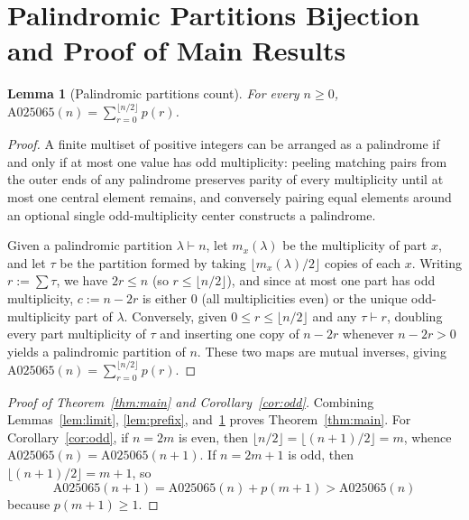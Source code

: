 \documentclass[11pt]{article}
\newtheorem{lemma}[theorem]{Lemma}
\begin{document}
\section{Palindromic Partitions Bijection and Proof of Main Results}

\begin{lemma}[Palindromic partitions count]\label{lem:pal}
For every $n \ge 0$, $\mathrm{A025065}(n) = \sum_{r=0}^{\lfloor n/2 \rfloor} p(r)$.
\end{lemma}

\begin{proof}
A finite multiset of positive integers can be arranged as a palindrome if and only if at most one value has odd multiplicity: peeling matching pairs from the outer ends of any palindrome preserves parity of every multiplicity until at most one central element remains, and conversely pairing equal elements around an optional single odd-multiplicity center constructs a palindrome.

Given a palindromic partition $\lambda \vdash n$, let $m_x(\lambda)$ be the multiplicity of part $x$, and let $\tau$ be the partition formed by taking $\lfloor m_x(\lambda)/2 \rfloor$ copies of each $x$. Writing $r := \sum \tau$, we have $2r \le n$ (so $r \le \lfloor n/2 \rfloor$), and since at most one part has odd multiplicity, $c := n - 2r$ is either $0$ (all multiplicities even) or the unique odd-multiplicity part of $\lambda$. Conversely, given $0 \le r \le \lfloor n/2 \rfloor$ and any $\tau \vdash r$, doubling every part multiplicity of $\tau$ and inserting one copy of $n - 2r$ whenever $n - 2r > 0$ yields a palindromic partition of $n$. These two maps are mutual inverses, giving $\mathrm{A025065}(n) = \sum_{r=0}^{\lfloor n/2 \rfloor} p(r)$.
\end{proof}

\begin{proof}[Proof of Theorem~\ref{thm:main} and Corollary~\ref{cor:odd}]
Combining Lemmas~\ref{lem:limit}, \ref{lem:prefix}, and~\ref{lem:pal} proves Theorem~\ref{thm:main}. For Corollary~\ref{cor:odd}, if $n = 2m$ is even, then $\lfloor n/2 \rfloor = \lfloor (n+1)/2 \rfloor = m$, whence $\mathrm{A025065}(n) = \mathrm{A025065}(n+1)$. If $n = 2m+1$ is odd, then $\lfloor (n+1)/2 \rfloor = m+1$, so
\[
\mathrm{A025065}(n+1) = \mathrm{A025065}(n) + p(m+1) > \mathrm{A025065}(n)
\]
because $p(m+1) \ge 1$.
\end{proof}
\end{document}
